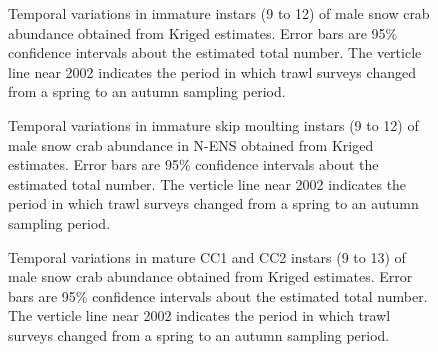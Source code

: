 \documentclass[11pt]{article}
\newcommand*{\D}{.}  %
\begin{document}
\begin{landscape}
\begin{figure}[ht]
\begin{center}
\end{center}
\caption{Temporal variations in immature instars (9 to 12) of male snow crab abundance obtained from Kriged estimates. Error bars are 95\% confidence intervals about the estimated total number. The verticle line near 2002 indicates the period in which trawl surveys changed from a spring to an autumn sampling period.}
\label{ts.mi.no}
\end{figure}
\end{landscape}



\begin{landscape}
\begin{figure}[ht]
\begin{center}
\end{center}
\caption{Temporal variations in immature skip moulting instars (9 to 12) of male snow crab abundance in N-ENS obtained from Kriged estimates. Error bars are 95\% confidence intervals about the estimated total number. The verticle line near 2002 indicates the period in which trawl surveys changed from a spring to an autumn sampling period.}
\label{ts.mi.sm.no}
\end{figure}
\end{landscape}


\begin{landscape}
\begin{figure}[ht]
\begin{center}
\end{center}
\caption{Temporal variations in mature CC1 and CC2 instars (9 to 13) of male snow crab abundance obtained from Kriged estimates. Error bars are 95\% confidence intervals about the estimated total number. The verticle line near 2002 indicates the period in which trawl surveys changed from a spring to an autumn sampling period.}
\label{ts.maCC12.no}
\end{figure}
\end{landscape}
\end{document}
